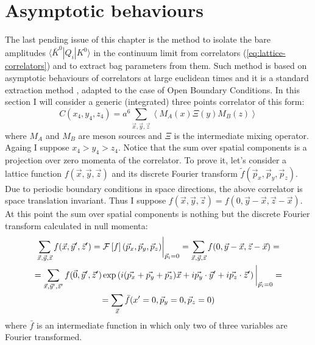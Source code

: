 \documentclass[english, LaM, oneside, noexaminfo]{sapthesis}
\newcommand{\la}{\langle}
\newcommand{\ra}{\rangle}
\newcommand{\obc}{Open Boundary Conditions}
\begin{document}
\section{Asymptotic behaviours}\label{sec:asympt-behav}
\noindent
The last pending issue of this chapter is the method to isolate the bare amplitudes $\la \bar K^0 | Q_i | K^0 \ra$ in the continuum limit from correlators (\ref{eq:lattice-correlators}) and to extract bag parameters from them.
Such method is based on asymptotic behaviours of correlators at large euclidean times and it is a standard extraction method \cite{montvay-munster}, adapted to the case of \obc\space \cite{ExtractionSpectralQuantities}.
In this section I will consider a generic (integrated) three points correlator of this form:
\begin{equation}\label{eq:correlator-prototype}
    C(x_4,y_4,z_4) = a^6\sum_{\vec x, \vec y, \vec z} \left\la M_A (x) \Xi (y) M_B (z) \right\ra
\end{equation}
where $M_{A}$ and $M_{B}$ are meson sources and $\Xi$ is the intermediate mixing operator.
Againg I suppose $x_4 > y_4 > z_4$.
Notice that the sum over spatial components is a projection over zero momenta of the correlator.
To prove it, let's consider a lattice function $f(\vec x,\vec y,\vec z)$ and its discrete Fourier transform $\tilde{f}(\vec p_x,\vec p_y,\vec p_z)$.
Due to periodic boundary conditions in space directions, the above correlator is space translation invariant.
Thus I suppose $f(\vec x, \vec y, \vec z) = f(0, \vec y - \vec x, \vec z - \vec x)$.
At this point the sum over spatial components is nothing but the discrete Fourier transform calculated in null momenta:
\begin{equation*}
    \begin{gathered}
        \sum_{\vec x, \vec y, \vec z} f(\vec x,\vec y',\vec z') = \mathcal{F}\left[f\right](\vec p_x,\vec p_y,\vec p_z)\bigg|_{\vec p_i = 0} = \sum_{\vec x, \vec y, \vec z} f(0, \vec y - \vec x, \vec z - \vec x) = \\
        = \sum_{\vec x, \vec y', \vec z'} f(\vec 0,\vec y',\vec z') \hspace*{.5mm} \text{exp}\left(i(\vec{p_x}+\vec{p_y}+\vec{p_z})\vec{x}+i\vec{p_y}\cdot\vec{y}'+i\vec{p_z}\cdot\vec{z}' \right)\bigg|_{\vec p_i = 0} = \\
        = \sum_{\vec x} \bar{f}(x'=0, \vec p_y = 0, \vec p_z = 0)
    \end{gathered}
\end{equation*}
where $\bar{f}$ is an intermediate function in which only two of three variables are Fourier transformed.
\end{document}

